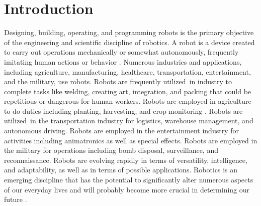 \documentclass[12pt,oneside]{article}
\begin{document}

\clearpage
\tableofcontents
\clearpage

\listoffigures

\listoftables
\clearpage


\cleardoublepage
{}
    \setcounter{page}{1}
\lhead{\nouppercase{\leftmark}}


\section{Introduction} \label{sec:einleitung}

Designing, building, operating, and programming robots is the primary objective of the engineering and scientific discipline of robotics. A robot is a device created to carry out operations mechanically or somewhat autonomously, frequently imitating human actions or behavior \cite{1_o2019legal}. Numerous industries and applications, including agriculture, manufacturing, healthcare, transportation, entertainment, and the military, use robots. Robots are frequently utilized in industry to complete tasks like welding, creating art, integration, and packing that could be repetitious or dangerous for human workers. Robots are employed in agriculture to do duties including planting, harvesting, and crop monitoring \cite{2_roldan2018robots}. Robots are utilized in the transportation industry for logistics, warehouse management, and autonomous driving. Robots are employed in the entertainment industry for activities including animatronics as well as special effects. Robots are employed in the military for operations including bomb disposal, surveillance, and reconnaissance. Robots are evolving rapidly in terms of versatility, intelligence, and adaptability, as well as in terms of possible applications. Robotics is an emerging discipline that has the potential to significantly alter numerous aspects of our everyday lives and will probably become more crucial in determining our future \cite{3_bostrom2018ethics}.
\end{document}
